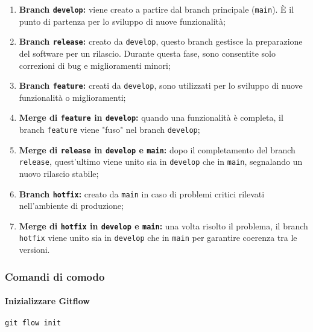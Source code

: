 \begin{enumerate}
    \item \textbf{Branch \texttt{develop}:} viene creato a partire dal branch principale (\texttt{main}). È il punto di partenza per lo sviluppo di nuove funzionalità;

    \item \textbf{Branch \texttt{release}:} creato da \texttt{develop}, questo branch gestisce la preparazione del software per un rilascio. Durante questa fase, sono consentite solo correzioni di bug e miglioramenti minori;

    \item \textbf{Branch \texttt{feature}:} creati da \texttt{develop}, sono utilizzati per lo sviluppo di nuove funzionalità o miglioramenti; 

    \item \textbf{Merge di \texttt{feature} in \texttt{develop}:} quando una funzionalità è completa, il branch \texttt{feature} viene "fuso" nel branch \texttt{develop};

    \item \textbf{Merge di \texttt{release} in \texttt{develop} e \texttt{main}:} dopo il completamento del branch \texttt{release}, quest'ultimo viene unito sia in \texttt{develop} che in \texttt{main}, segnalando un nuovo rilascio stabile;

    \item \textbf{Branch \texttt{hotfix}:} creato da \texttt{main} in caso di problemi critici rilevati nell'ambiente di produzione;

    \item \textbf{Merge di \texttt{hotfix} in \texttt{develop} e \texttt{main}:} una volta risolto il problema, il branch \texttt{hotfix} viene unito sia in \texttt{develop} che in \texttt{main} per garantire coerenza tra le versioni.
\end{enumerate}

\subsubsection*{Comandi di comodo}
\paragraph*{Inizializzare Gitflow}

\begin{lstlisting}[style=code]
    git flow init
    \end{lstlisting}
    
